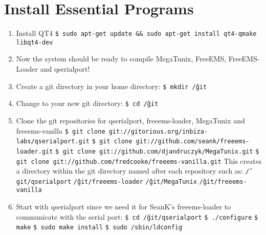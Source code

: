 \documentclass[12pt,notitlepage,onecolumn,oneside,openany,draft]{memoir}
\begin{document}
\chapter{\textsf{Install Essential Programs}}

\begin{enumerate}
\item \textsf{Install QT4} \newline
      \texttt{\$ sudo apt-get update \&\& sudo apt-get install qt4-qmake libqt4-dev}

\item \textsf{Now the system should be ready to compile MegaTunix, FreeEMS, FreeEMS-Loader and qserialport!}

\item \textsf{Create a git directory in your home directory:} \newline
      \texttt{\$ mkdir \~/git}

\item \textsf{Change to your new git directory:} \newline
      \texttt{\$ cd \~/git}

\item \textsf{Clone the git repositories for qserialport, freeems-loader, MegaTunix and freeems-vanilla} \newline
      \texttt{\$ git clone git://gitorious.org/inbiza-labs/qserialport.git} \newline
      \texttt{\$ git clone git://github.com/seank/freeems-loader.git} \newline
      \texttt{\$ git clone git://github.com/djandruczyk/MegaTunix.git} \newline
      \texttt{\$ git clone git://github.com/fredcooke/freeems-vanilla.git} \newline
      \newline
      \textsf{This creates a directory within the git directory named after each repository such as:} \newline
      \texttt{\~/git/qserialport} \newline	
      \texttt{\~/git/freeems-loader} \newline
      \texttt{\~/git/MegaTunix} \newline
      \texttt{\~/git/freeems-vanilla}

\item \textsf{Start with qserialport since we need it for SeanK's freeems-loader to communicate with the serial port:} \newline
      \texttt{\$ cd \~/git/qserialport} \newline
      \texttt{\$ ./configure} \newline
      \texttt{\$ make} \newline
      \texttt{\$ sudo make install} \newline
      \texttt{\$ sudo /sbin/ldconfig} \newline
\end{enumerate}
\end{document}
